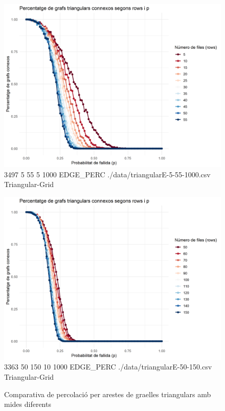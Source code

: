 \documentclass[a4paper]{article}
\begin{document}
		\begin{figure}[H]
		\centering
		\begin{minipage}{0.45\textwidth}
			\centering
			\includegraphics[width=\textwidth]{images/triangularE-5-55-1000}
			\footnotesize{3497 5 55 5 1000 EDGE\_PERC ./data/triangularE-5-55-1000.csv Triangular-Grid}
		\end{minipage}
		\hfill
		\begin{minipage}{0.45\textwidth}
			\centering
			\includegraphics[width=\textwidth]{images/triangularE-50-150}
			\footnotesize{3363 50 150 10 1000 EDGE\_PERC ./data/triangularE-50-150.csv Triangular-Grid}
		\end{minipage}
		\caption{Comparativa de percolació per arestes de graelles triangulars amb mides diferents}
		\label{fig:percolation_edges_triangular}
	\end{figure}
	
\end{document}
